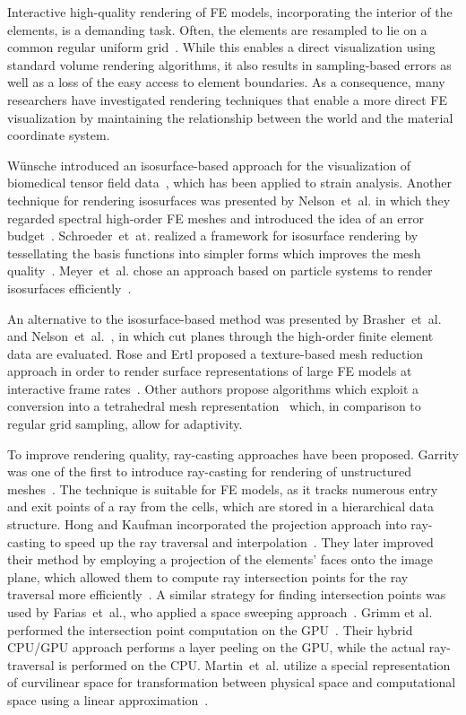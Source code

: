 \documentclass[journal]{vgtc}                %
\begin{document}
Interactive high-quality rendering of FE models, incorporating the interior of the elements, is a demanding task. Often, the elements are resampled to lie on a common regular uniform grid~\cite{Wihelms90}. While this enables a direct visualization using standard volume rendering algorithms, it also results in sampling-based errors as well as a loss of the easy access to element boundaries. As a consequence, many researchers have investigated rendering techniques that enable a more direct FE visualization by maintaining the relationship between the world and the material coordinate system.

W{\"u}nsche introduced an isosurface-based approach for the visualization of biomedical tensor field data~\cite{wunsche03femvis}, which has been applied to strain analysis. Another technique for rendering isosurfaces was presented by Nelson~et~al. in which they regarded spectral high-order FE  meshes and introduced the idea of an error budget~\cite{nelsonhp06}. Schroeder~et~at. realized a framework for isosurface rendering by tessellating the basis functions into simpler forms which improves the mesh quality~\cite{schroeder06femtess}. Meyer~et~al. chose an approach based on particle systems to render isosurfaces efficiently~\cite{Meyer06}.

An alternative to the isosurface-based method was presented by Brasher~et~al.~\cite{brasher04} and Nelson~et~al.~\cite{nelson11}, in which cut planes through the high-order finite element data are evaluated. Rose and Ertl proposed a texture-based mesh reduction approach in order to render surface representations of large FE models at interactive frame rates~\cite{rose03femvis}. Other authors propose algorithms which exploit a conversion into a tetrahedral mesh representation~\cite{Reed95IncrementalSlicing, marmitt05femtess, Georgii06ageneric} which, in comparison to regular grid sampling, allow for adaptivity.

To improve rendering quality, ray-casting approaches have been proposed. Garrity was one of the first to introduce ray-casting for rendering of unstructured meshes~\cite{garrity90RaytracingIrregular}. The technique is suitable for FE models, as it tracks numerous entry and exit points of a ray from the cells, which are stored in a hierarchical data structure. Hong and Kaufman incorporated the projection approach into ray-casting to speed up the ray traversal and interpolation~\cite{hong98curvilinear}. They later improved their method by employing a projection of the elements' faces onto the image plane, which allowed them to compute ray intersection points for the ray traversal more efficiently~\cite{hong99curvilinear}. A similar strategy for finding intersection points was used by Farias~et~al., who applied a space sweeping approach~\cite{farias00zsweep}. Grimm et al. performed the intersection point computation on the GPU~\cite{grimm04curvilinear}. Their hybrid CPU/GPU approach performs a layer peeling on the GPU, while the actual ray-traversal is performed on the CPU. Martin~et~al. utilize a special representation of curvilinear space for transformation between physical space and computational space using a linear approximation~\cite{MartinCurvilinearPacificVIS08}.
\end{document}
